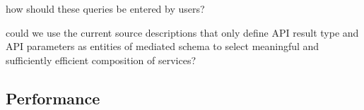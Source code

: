	\begin{compactitem}
		\item how should these queries be entered by users?

		\item could we use the current source descriptions that only define API result type and API parameters as entities of mediated schema to select meaningful and sufficiently efficient composition of services?
	\end{compactitem}
	
       
\subsection{Performance}


